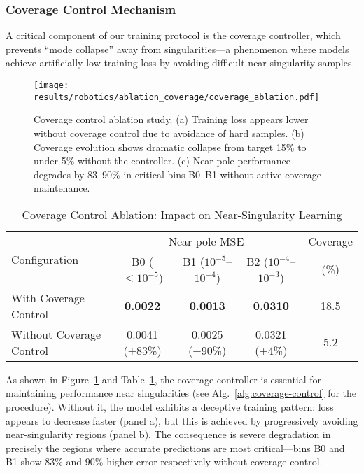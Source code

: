 \documentclass[twoside,11pt]{article}
\begin{document}
\subsubsection{Coverage Control Mechanism}
A critical component of our training protocol is the coverage controller, which prevents ``mode collapse'' away from singularities---a phenomenon where models achieve artificially low training loss by avoiding difficult near-singularity samples.

\begin{figure}[t]
\centering
\texttt{[image: results/robotics/ablation\_coverage/coverage\_ablation.pdf]}
\caption{Coverage control ablation study. (a) Training loss appears lower without coverage control due to avoidance of hard samples. (b) Coverage evolution shows dramatic collapse from target 15\% to under 5\% without the controller. (c) Near-pole performance degrades by 83--90\% in critical bins B0--B1 without active coverage maintenance.}
\label{fig:coverage_ablation}
\end{figure}

\begin{table}[t]
\centering
\caption{Coverage Control Ablation: Impact on Near-Singularity Learning}
\label{tab:coverage_ablation}
\begin{tabular}{lcccc}
\toprule
\multirow{2}{*}{Configuration} & \multicolumn{3}{c}{Near-pole MSE} & Coverage \\
\cmidrule(lr){2-4} \cmidrule(lr){5-5}
 & B0 ($\leq 10^{-5}$) & B1 ($10^{-5}$--$10^{-4}$) & B2 ($10^{-4}$--$10^{-3}$) & (\%) \\
\midrule
With Coverage Control    & \textbf{0.0022} & \textbf{0.0013} & \textbf{0.0310} & 18.5 \\
Without Coverage Control & 0.0041 (+83\%) & 0.0025 (+90\%) & 0.0321 (+4\%) & 5.2 \\
\bottomrule
\end{tabular}
\end{table}

As shown in Figure~\ref{fig:coverage_ablation} and Table~\ref{tab:coverage_ablation}, the coverage controller is essential for maintaining performance near singularities (see Alg.~\ref{alg:coverage-control} for the procedure). Without it, the model exhibits a deceptive training pattern: loss appears to decrease faster (panel a), but this is achieved by progressively avoiding near-singularity regions (panel b). The consequence is severe degradation in precisely the regions where accurate predictions are most critical---bins B0 and B1 show 83\% and 90\% higher error respectively without coverage control.
\end{document}
